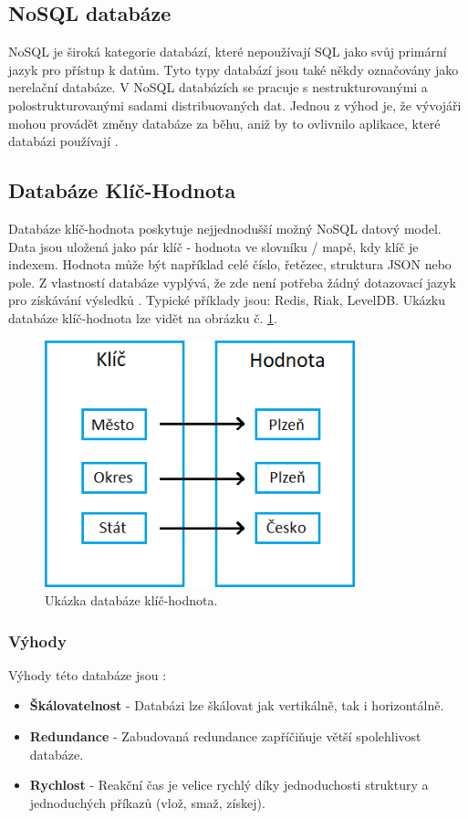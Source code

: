 \subsection{NoSQL databáze}
NoSQL je široká kategorie databází, které nepoužívají \gls{SQL} jako svůj primární jazyk pro přístup k datům. Tyto typy databází jsou také někdy označovány jako nerelační databáze. V NoSQL databázích se pracuje s nestrukturovanými a polostrukturovanými sadami distribuovaných dat. Jednou z výhod je, že vývojáři mohou provádět změny databáze za běhu, aniž by to ovlivnilo aplikace, které databázi používají \cite{nosqlDatabaseBook}.

\subsection{Databáze Klíč-Hodnota}
Databáze klíč-hodnota poskytuje nejjednodušší možný NoSQL datový model. Data jsou uložená jako pár klíč - hodnota ve slovníku / mapě, kdy klíč je indexem. Hodnota může být například celé číslo, řetězec, struktura \gls{JSON} nebo pole. Z vlastností databáze vyplývá, že zde není potřeba žádný dotazovací jazyk pro získávání výsledků \cite{nosqlDatabaseBook}. Typické příklady jsou: Redis, Riak, LevelDB. Ukázku databáze klíč-hodnota lze vidět na obrázku č. \ref{fig:db_img_keyvalue}.
	\begin{figure}[H]
	\centering
	\includegraphics[width=9cm]{img/databaze/keyvalue_db}
	\caption{Ukázka databáze klíč-hodnota.}
	\label{fig:db_img_keyvalue}
	\end{figure}
\subsubsection{Výhody}
Výhody této databáze jsou \cite{advantages_keyvalue}:
\begin{itemize}
\item \textbf{Škálovatelnost} - Databázi lze škálovat jak vertikálně, tak i horizontálně. 
\item \textbf{Redundance} - Zabudovaná redundance zapříčiňuje větší spolehlivost databáze.
\item \textbf{Rychlost} - Reakční čas je velice rychlý díky jednoduchosti struktury a jednoduchých příkazů (vlož, smaž, získej).
\end{itemize}

